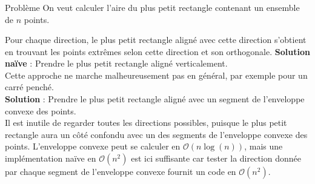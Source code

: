 \begin{frame}
    \frametitle{\problemtitle}
    \begin{block}{Problème}
        On veut calculer l'aire du plus petit rectangle contenant un ensemble de $n$ points.
    \end{block}
    \pause
    Pour chaque direction, le plus petit rectangle aligné avec cette direction s'obtient en trouvant les points extrêmes selon cette direction et son orthogonale. \newline \newline
    \textbf{Solution naïve} : Prendre le plus petit rectangle aligné verticalement. \\
    \pause
    Cette approche ne marche malheureusement pas en général, par exemple pour un carré penché. \\
    \pause
    \textbf{Solution} : Prendre le plus petit rectangle aligné avec un segment de l'enveloppe convexe des points.\\
    \pause
    Il est inutile de regarder toutes les directions possibles, puisque le plus petit rectangle aura un côté confondu avec un des segments de l'enveloppe convexe des points. \newline
    \pause
    L'enveloppe convexe peut se calculer en $\mathcal{O}(n \log(n))$, mais une implémentation naïve en $\mathcal{O}(n^2)$ est ici suffisante car tester la direction donnée par chaque segment de l'enveloppe convexe fournit un code en $\mathcal{O}(n^2)$.

    \pause\solvestats
\end{frame}